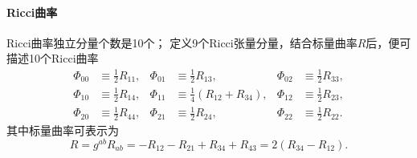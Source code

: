 \paragraph{Ricci曲率}
Ricci曲率独立分量个数是10个；
定义9个Ricci张量分量，结合标量曲率$R$后，便可描述10个Ricci曲率
\begin{equation}\label{chnull:eqn_ricci-all}
    \begin{aligned}
        \Phi_{00}&\equiv \frac{1}{2} R_{11}, &
        \Phi_{01}&\equiv \frac{1}{2} R_{13}, &
        \Phi_{02}&\equiv \frac{1}{2} R_{33}, \\
        \Phi_{10}&\equiv \frac{1}{2} R_{14}, &
        \Phi_{11}&\equiv \frac{1}{4} (R_{12} + R_{34}), &
        \Phi_{12}&\equiv \frac{1}{2} R_{23}, \\
        \Phi_{20}&\equiv \frac{1}{2} R_{44} , &
        \Phi_{21}&\equiv \frac{1}{2} R_{24}, &
        \Phi_{22}&\equiv \frac{1}{2} R_{22}.
    \end{aligned}
\end{equation}
其中标量曲率可表示为
\begin{equation}
    R= g^{ab}R_{ab}=-R_{12} -R_{21} +R_{34}+R_{43} = 2(R_{34}-R_{12}) .
\end{equation}

